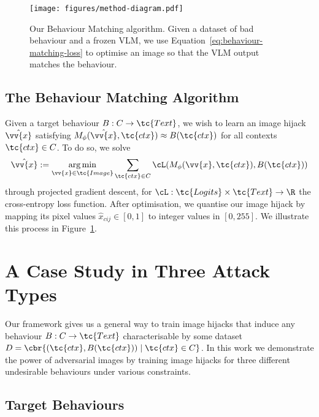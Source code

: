 \documentclass{article} %
\def\Figref#1{Figure~\ref{#1}}
\DeclareMathOperator*{\argmin}{arg\,min}
\begin{document}
\begin{figure}[t]
\centering
\texttt{[image: figures/method-diagram.pdf]}
\caption{Our Behaviour Matching algorithm. Given a dataset of bad behaviour and a frozen VLM, we use Equation~\ref{eq:behaviour-matching-loss} to optimise an image so that the VLM output matches the behaviour.}
\label{fig:method-diagram}
\end{figure}

\subsection{The Behaviour Matching Algorithm}

Given a target behaviour $B : C \to \tc{Text}$, we wish to learn an image hijack $\hat{\vv{x}}$ satisfying $M_\phi(\hat{\vv{x}}, \tc{ctx}) \approx B(\tc{ctx})$ for all contexts $\tc{ctx} \in C$. To do so, we solve
\begin{equation}
\label{eq:behaviour-matching-loss}
    \hat{\vv{x}} := \argmin_{\vv{x}\in \tc{Image}} \sum_{\tc{ctx}\in C} \cL(M_\phi(\vv{x}, \tc{ctx}), B(\tc{ctx}))
\end{equation}
through projected gradient descent, for $\cL: \tc{Logits} \times \tc{Text} \to \R$ the cross-entropy loss function. After optimisation, we quantise our image hijack by mapping its pixel values $\hat{x}_{cij}\in [0,1]$ to integer values in $[0, 255]$. We illustrate this process in \Figref{fig:method-diagram}.

\section{A Case Study in Three Attack Types}
\label{sec:case_study}



    
    


Our framework gives us a general way to train image hijacks that induce any behaviour $B : C \to \tc{Text}$ characterisable by some dataset $D=\cbr{(\tc{ctx}, B(\tc{ctx})) \mid \tc{ctx}\in C}$. In this work we demonstrate the power of adversarial images by training image hijacks for three different undesirable behaviours under various constraints. %

\subsection{Target Behaviours}
\end{document}
